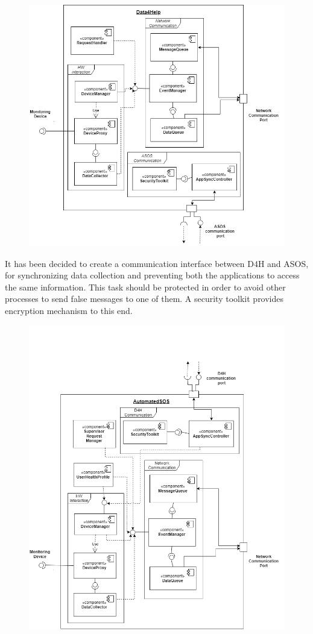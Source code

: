 \begin{figure}[H]
	\includegraphics[scale=0.5]{images/uml/D4H_component}
\end{figure}

It has been decided to create a communication interface between D4H and ASOS, for synchronizing data collection and preventing both the applications to access the same information. This task should be protected in order to avoid other processes to send false messages to one of them. A security toolkit provides encryption mechanism to this end.
\begin{figure}[H]
	\includegraphics[scale=0.5]{images/uml/ASOS_component}
\end{figure}




